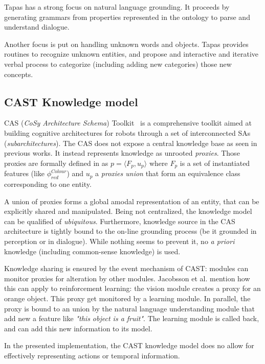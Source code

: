 {\sc Tapas} has a strong focus on natural language grounding. It proceeds by
generating grammars from properties represented in the ontology to parse and
understand dialogue.

Another focus is put on handling unknown words and objects. {\sc Tapas}
provides routines to recognize unknown entities, and propose and interactive
and iterative verbal process to categorize (including adding new categories)
those new concepts.

\subsection{CAST Knowledge model}
\label{sect|cast}

CAS (\emph{CoSy Architecture Schema}) Toolkit~\cite{Hawes2007} is a
comprehensive toolkit aimed at building cognitive architectures for robots
through a set of interconnected SAs (\emph{subarchitectures}). The CAS does not
expose a central knowledge base as seen in previous works. It instead
represents knowledge as unrooted \emph{proxies}. Those proxies are formally
defined in \cite{Jacobsson2008} as $p= \langle F_p, u_p \rangle$ where $F_p$ is
a set of instantiated features (like $\phi^{Colour}_{red}$) and $u_p$ a
\emph{proxies union} that form an equivalence class corresponding to one
entity.

A union of proxies forms a global amodal representation of an entity, that can
be explicitly shared and manipulated. Being not centralized, the knowledge
model can be qualified of \emph{ubiquitous}. Furthermore, knowledge source in
the CAS architecture is tightly bound to the on-line grounding process (be it
grounded in perception or in dialogue). While nothing seems to prevent it, no
{\it a priori} knowledge (including common-sense knowledge) is used.

Knowledge sharing is ensured by the event mechanism of CAST: modules can
monitor proxies for alteration by other modules. Jacobsson et al. mention how
this can apply to reinforcement learning: the vision module creates a proxy for
an orange object. This proxy get monitored by a learning module. In parallel,
the proxy is bound to an union by the natural language understanding module
that add new a feature like \emph{"this object is a fruit"}. The learning
module is called back, and can add this new information to its model.

In the presented implementation, the CAST knowledge model does no allow for
effectively representing actions or temporal information.

